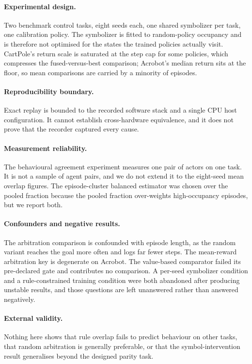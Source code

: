 \documentclass[11pt,a4paper]{article}
\begin{document}
\paragraph{Experimental design.} Two benchmark control tasks, eight seeds each, one shared symbolizer per task, one calibration policy. The symbolizer is fitted to random-policy occupancy and is therefore not optimised for the states the trained policies actually visit. CartPole's return scale is saturated at the step cap for some policies, which compresses the fused-versus-best comparison; Acrobot's median return sits at the floor, so mean comparisons are carried by a minority of episodes.

\paragraph{Reproducibility boundary.} Exact replay is bounded to the recorded software stack and a single CPU host configuration. It cannot establish cross-hardware equivalence, and it does not prove that the recorder captured every cause.

\paragraph{Measurement reliability.} The behavioural agreement experiment measures one pair of actors on one task. It is not a sample of agent pairs, and we do not extend it to the eight-seed mean overlap figures. The episode-cluster balanced estimator was chosen over the pooled fraction because the pooled fraction over-weights high-occupancy episodes, but we report both.

\paragraph{Confounders and negative results.} The arbitration comparison is confounded with episode length, as the random variant reaches the goal more often and logs far fewer steps. The mean-reward arbitration key is degenerate on Acrobot. The value-based comparator failed its pre-declared gate and contributes no comparison. A per-seed symbolizer condition and a rule-constrained training condition were both abandoned after producing unstable results, and those questions are left unanswered rather than answered negatively.

\paragraph{External validity.} Nothing here shows that rule overlap fails to predict behaviour on other tasks, that random arbitration is generally preferable, or that the symbol-intervention result generalises beyond the designed parity task.
\end{document}
